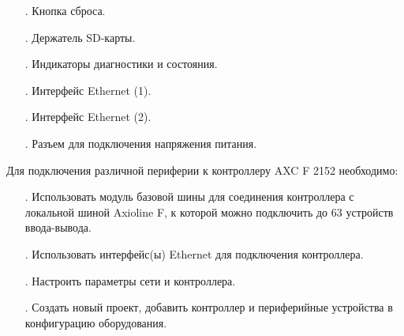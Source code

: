 {\begin{itemize}[leftmargin=2.15cm, labelwidth=0.65cm, labelsep=0.0cm]
		\addtocounter{itemcntr}{1}
		
		\item[\theitemcntr. ]	Кнопка сброса.
		
		\addtocounter{itemcntr}{1}
		
		\item[\theitemcntr. ] Держатель SD-карты.
		
		\addtocounter{itemcntr}{1}
		
		\item[\theitemcntr. ] Индикаторы диагностики и состояния.
		
		\addtocounter{itemcntr}{1}
		
		\item[\theitemcntr. ] Интерфейс Ethernet (1).
		
		\addtocounter{itemcntr}{1}
		
		\item[\theitemcntr. ] Интерфейс Ethernet (2).
		
		\addtocounter{itemcntr}{1}
		
		\item[\theitemcntr. ] Разъем для подключения напряжения питания.
		
		\addtocounter{itemcntr}{1}
		
		\setcounter{itemcntr}{1}
	\end{itemize}
	
	\par \redline Для подключения различной периферии к контроллеру AXC F 2152 необходимо:
	
	\begin{itemize}[leftmargin=2.15cm, labelwidth=0.65cm, labelsep=0.0cm] 
		
		\item[\theitemcntr. ] Использовать модуль базовой шины для соединения контроллера с локальной шиной Axioline F, к которой можно подключить до 63 устройств ввода-вывода.
		
		\addtocounter{itemcntr}{1}
		
		\item[\theitemcntr. ] Использовать интерфейс(ы) Ethernet для подключения контроллера.
		
		\addtocounter{itemcntr}{1}
		
		\item[\theitemcntr. ] Настроить параметры сети и контроллера.
		
		\addtocounter{itemcntr}{1}
		
		\item[\theitemcntr. ] Создать новый проект, добавить контроллер и периферийные устройства в конфигурацию оборудования.
		

\end{itemize}}
